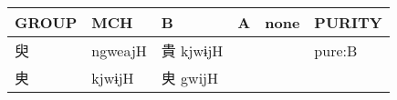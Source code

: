 \documentclass[14pt,a4paper]{scrartcl}
\begin{document}
\begin{longtable}[c]{@{}llllll@{}}
\toprule
\begin{minipage}[b]{0.14\columnwidth}\raggedright\strut
GROUP
\strut\end{minipage} &
\begin{minipage}[b]{0.14\columnwidth}\raggedright\strut
MCH
\strut\end{minipage} &
\begin{minipage}[b]{0.14\columnwidth}\raggedright\strut
B
\strut\end{minipage} &
\begin{minipage}[b]{0.14\columnwidth}\raggedright\strut
A
\strut\end{minipage} &
\begin{minipage}[b]{0.14\columnwidth}\raggedright\strut
none
\strut\end{minipage} &
\begin{minipage}[b]{0.14\columnwidth}\raggedright\strut
PURITY
\strut\end{minipage}\tabularnewline
\midrule
\endhead
\begin{minipage}[t]{0.14\columnwidth}\raggedright\strut
臾
\strut\end{minipage} &
\begin{minipage}[t]{0.14\columnwidth}\raggedright\strut
ngweajH
\strut\end{minipage} &
\begin{minipage}[t]{0.14\columnwidth}\raggedright\strut
貴 kjwɨjH
\strut\end{minipage} &
\begin{minipage}[t]{0.14\columnwidth}\raggedright\strut
\strut\end{minipage} &
\begin{minipage}[t]{0.14\columnwidth}\raggedright\strut
\strut\end{minipage} &
\begin{minipage}[t]{0.14\columnwidth}\raggedright\strut
pure:B
\strut\end{minipage}\tabularnewline
\begin{minipage}[t]{0.14\columnwidth}\raggedright\strut
㬰
\strut\end{minipage} &
\begin{minipage}[t]{0.14\columnwidth}\raggedright\strut
kjwɨjH
\strut\end{minipage} &
\begin{minipage}[t]{0.14\columnwidth}\raggedright\strut
㬰 gwijH
\strut\end{minipage} &
\begin{minipage}[t]{0.14\columnwidth}\raggedright\strut

\end{minipage}
\end{longtable}
\end{document}
